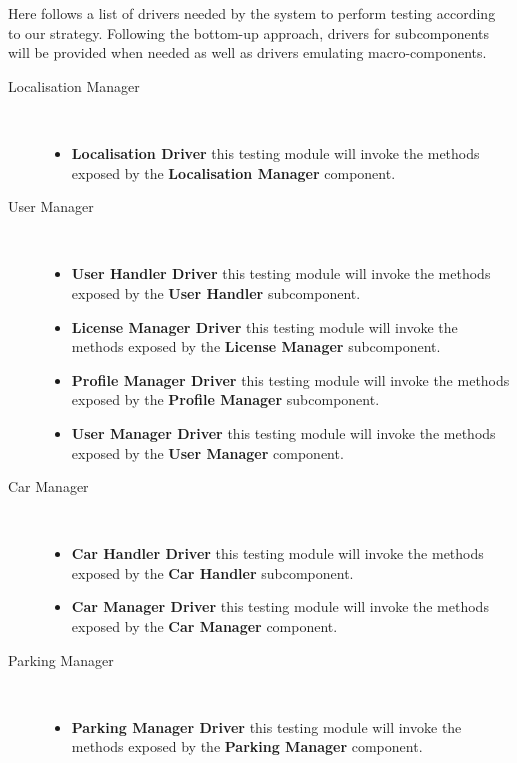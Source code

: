 		Here follows a list of drivers needed by the system to perform testing according to our strategy. Following the bottom-up approach, drivers for subcomponents will be provided when needed as well as drivers emulating macro-components.
		
		\begin{description}
		\item[Localisation Manager]~\\
			\begin{itemize}
				\item \textbf{Localisation Driver} this testing module will invoke the methods exposed by the \textbf{Localisation Manager} component.
			\end{itemize}
		\item[User Manager]~\\ 
			\begin{itemize}
				\item \textbf{User Handler Driver} this testing module will invoke the methods exposed by the \textbf{User Handler} subcomponent.
				\item \textbf{License Manager Driver} this testing module will invoke the methods exposed by the \textbf{License Manager} subcomponent.
				\item \textbf{Profile Manager Driver} this testing module will invoke the methods exposed by the \textbf{Profile Manager} subcomponent.
				\item \textbf{User Manager Driver} this testing module will invoke the methods exposed by the \textbf{User Manager} component.
			\end{itemize}
		\item[Car Manager]~\\
			\begin{itemize}
				\item \textbf{Car Handler Driver} this testing module will invoke the methods exposed by the \textbf{Car Handler} subcomponent.
				\item \textbf{Car Manager Driver} this testing module will invoke the methods exposed by the \textbf{Car Manager} component.
			\end{itemize}
		\item[Parking Manager]~\\
			\begin{itemize}
				\item \textbf{Parking Manager Driver} this testing module will invoke the methods exposed by the \textbf{Parking Manager} component.
			\end{itemize}

\end{description}
